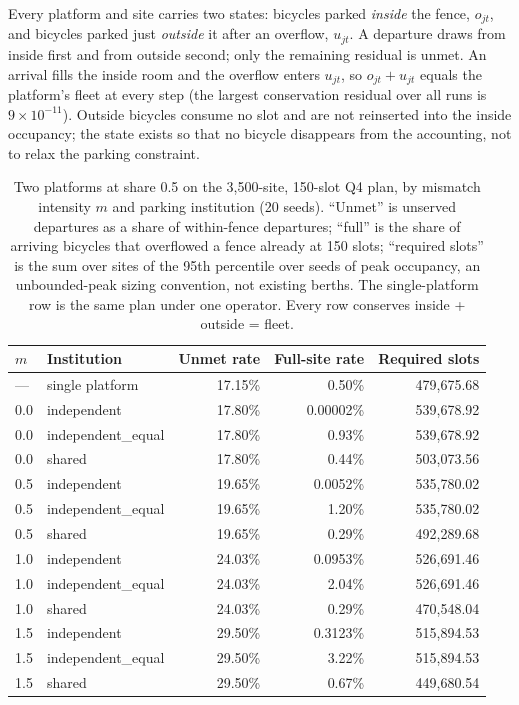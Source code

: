 Every platform and site carries two states: bicycles parked \emph{inside} the fence,
$o_{jt}$, and bicycles parked just \emph{outside} it after an overflow, $u_{jt}$. A
departure draws from inside first and from outside second; only the remaining residual
is unmet. An arrival fills the inside room and the overflow enters $u_{jt}$, so
$o_{jt}+u_{jt}$ equals the platform's fleet at every step (the largest conservation
residual over all runs is $9\times10^{-11}$). Outside bicycles consume no slot and are
not reinserted into the
inside occupancy; the state exists so that no bicycle disappears from the accounting,
not to relax the parking constraint.

\begin{table}[htbp]
\centering
\footnotesize
\caption[Q5 spatial mismatch]{Two platforms at share 0.5 on the 3,500-site, 150-slot Q4
plan, by mismatch intensity $m$ and parking institution (20 seeds). ``Unmet'' is
unserved departures as a share of within-fence departures; ``full'' is the share of
arriving bicycles that overflowed a fence already at 150 slots; ``required slots'' is
the sum over sites of the 95th percentile over seeds of peak occupancy, an
unbounded-peak sizing convention, not existing berths.
The single-platform row is the same plan under one operator. Every row conserves
inside + outside = fleet.}
\label{tab:q5mismatch}
\scriptsize
\begin{tabular}{@{}llrrr@{}}
\toprule
$m$ & \textbf{Institution} & \textbf{Unmet rate} & \textbf{Full-site rate} &
\textbf{Required slots} \\
\midrule
--- & single platform & 17.15\% & 0.50\% & 479,675.68 \\
\midrule
0.0 & independent        & 17.80\% & 0.00002\% & 539,678.92 \\
0.0 & independent\_equal & 17.80\% & 0.93\%    & 539,678.92 \\
0.0 & shared             & 17.80\% & 0.44\%    & 503,073.56 \\
\midrule
0.5 & independent        & 19.65\% & 0.0052\%  & 535,780.02 \\
0.5 & independent\_equal & 19.65\% & 1.20\%    & 535,780.02 \\
0.5 & shared             & 19.65\% & 0.29\%    & 492,289.68 \\
\midrule
1.0 & independent        & 24.03\% & 0.0953\%  & 526,691.46 \\
1.0 & independent\_equal & 24.03\% & 2.04\%    & 526,691.46 \\
1.0 & shared             & 24.03\% & 0.29\%    & 470,548.04 \\
\midrule
1.5 & independent        & 29.50\% & 0.3123\%  & 515,894.53 \\
1.5 & independent\_equal & 29.50\% & 3.22\%    & 515,894.53 \\
1.5 & shared             & 29.50\% & 0.67\%    & 449,680.54 \\
\bottomrule
\end{tabular}
\end{table}

